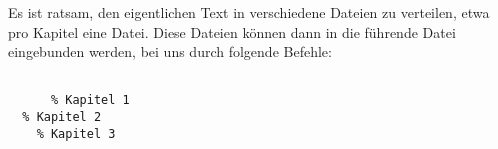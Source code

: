 Es ist ratsam, den eigentlichen Text in verschiedene Dateien zu
verteilen, etwa pro Kapitel eine Datei. Diese Dateien können dann in die
führende Datei eingebunden werden, bei uns durch folgende Befehle:

\begin{lstlisting}

      % Kapitel 1
  % Kapitel 2
    % Kapitel 3

\end{lstlisting}

